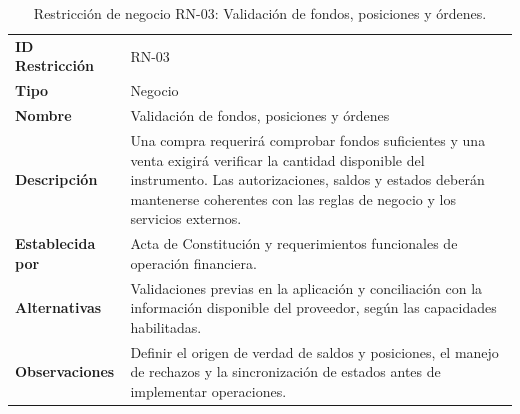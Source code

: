 \documentclass[11pt,a4paper,oneside]{article}
\begin{document}
\begingroup
\small
\setlength{\tabcolsep}{7pt}
\renewcommand{\arraystretch}{1.30}
\setlength{\anchoRegistro}{\dimexpr\textwidth-4\tabcolsep-3\arrayrulewidth\relax}
\begin{table}[H]
\centering
\caption{Restricción de negocio RN-03: Validación de fondos, posiciones y órdenes.}
\label{tab:restriccion-rn-03}
\begin{tabular}{|
>{\RaggedRight\arraybackslash}p{.28\anchoRegistro}|
>{\RaggedRight\arraybackslash}p{.72\anchoRegistro}|}
\hline
\rowcolor{negroTabla}
\multicolumn{2}{|l|}{\color{white}\bfseries Registro de Restricción de Negocio}\\\hline
\cellcolor{azulTabla}\bfseries ID Restricción
& RN-03\\\hline
\cellcolor{azulTabla}\bfseries Tipo
& Negocio\\\hline
\cellcolor{azulTabla}\bfseries Nombre
& Validación de fondos, posiciones y órdenes\\\hline
\cellcolor{azulTabla}\bfseries Descripción
& Una compra requerirá comprobar fondos suficientes y una venta exigirá verificar la cantidad disponible del instrumento. Las autorizaciones, saldos y estados deberán mantenerse coherentes con las reglas de negocio y los servicios externos.\\\hline
\cellcolor{azulTabla}\bfseries Establecida por
& Acta de Constitución y requerimientos funcionales de operación financiera.\\\hline
\cellcolor{azulTabla}\bfseries Alternativas
& Validaciones previas en la aplicación y conciliación con la información disponible del proveedor, según las capacidades habilitadas.\\\hline
\cellcolor{azulTabla}\bfseries Observaciones
& Definir el origen de verdad de saldos y posiciones, el manejo de rechazos y la sincronización de estados antes de implementar operaciones.\\\hline
\end{tabular}
\end{table}
\endgroup
\end{document}
